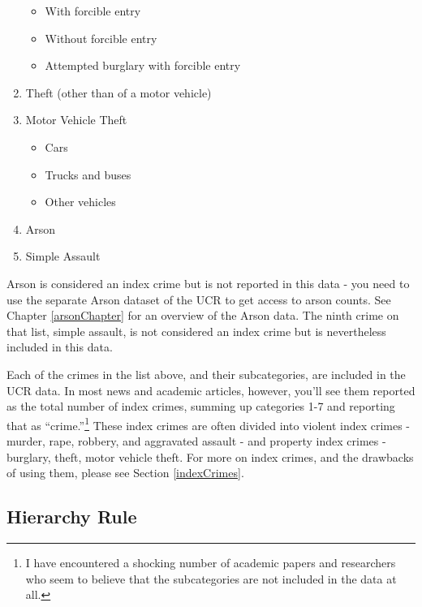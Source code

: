 \documentclass[
  12pt,
  openany]{book}
\providecommand{\tightlist}{%
  \setlength{\itemsep}{0pt}\setlength{\parskip}{0pt}}
\begin{document}
\begin{enumerate}
  \begin{itemize}
  \tightlist
  \item
    With forcible entry\\
  \item
    Without forcible entry\\
  \item
    Attempted burglary with forcible entry\\
  \end{itemize}
\item
  Theft (other than of a motor vehicle)\\
\item
  Motor Vehicle Theft

  \begin{itemize}
  \tightlist
  \item
    Cars\\
  \item
    Trucks and buses\\
  \item
    Other vehicles\\
  \end{itemize}
\item
  Arson\\
\item
  Simple Assault
\end{enumerate}

Arson is considered an index crime but is not reported in this data - you need to use the separate Arson dataset of the UCR to get access to arson counts. See Chapter \ref{arsonChapter} for an overview of the Arson data. The ninth crime on that list, simple assault, is not considered an index crime but is nevertheless included in this data.

Each of the crimes in the list above, and their subcategories, are included in the UCR data. In most news and academic articles, however, you'll see them reported as the total number of index crimes, summing up categories 1-7 and reporting that as ``crime.''\footnote{I have encountered a shocking number of academic papers and researchers who seem to believe that the subcategories are not included in the data at all.} These index crimes are often divided into violent index crimes - murder, rape, robbery, and aggravated assault - and property index crimes - burglary, theft, motor vehicle theft. For more on index crimes, and the drawbacks of using them, please see Section \ref{indexCrimes}.

\subsection{Hierarchy Rule}\label{hierarchy}
\end{document}
